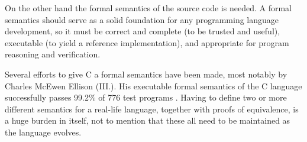 \begin{multicols*}{2}
	On the other hand the formal semantics of the source code is needed.  A formal semantics should serve as a solid foundation for any programming language development, so it must be correct and complete (to be trusted and useful), executable (to yield a reference implementation), and appropriate for program reasoning and verification.
	
	Several efforts to give C a formal semantics have been made, most notably by Charles McEwen Ellison (III.). His executable formal semantics of the C language successfully passes  99.2\% of 776 test programs \cite{Ellison:2012:EFS:2103621.2103719}. Having to define two or more different semantics for a real-life language, together with proofs of equivalence, is a huge burden in itself, not to mention that these all need to be maintained as the language evolves.
	
\end{multicols*}

